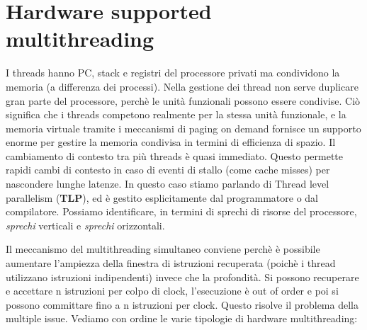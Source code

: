 \section{Hardware supported multithreading}
I threads hanno PC, stack e registri del processore privati ma condividono la memoria (a differenza dei processi). Nella gestione dei thread non serve duplicare gran parte del processore, perchè le unità funzionali possono essere condivise. Ciò significa che i threads competono realmente per la stessa unità funzionale, e la memoria virtuale tramite i meccanismi di paging on demand fornisce un supporto enorme per gestire la memoria condivisa in termini di efficienza di spazio. Il cambiamento di contesto tra più threads è quasi immediato. Questo permette rapidi cambi di contesto in caso di eventi di stallo (come cache misses) per nascondere lunghe latenze. In questo caso stiamo parlando di Thread level parallelism (\textbf{TLP}), ed è gestito esplicitamente dal programmatore o dal compilatore. 
Possiamo identificare, in termini di sprechi di risorse del processore, \textit{sprechi} verticali e \textit{sprechi} orizzontali.

\begin{figure}[ht]
    \centering
    \setlength{\fboxrule}{0.5pt} %
    \setlength{\fboxsep}{0pt}    %
\end{figure}

Il meccanismo del multithreading simultaneo conviene perchè è possibile aumentare l'ampiezza della finestra di istruzioni recuperata (poichè i thread utilizzano istruzioni indipendenti) invece che la profondità. Si possono recuperare e accettare n istruzioni per colpo di clock, l'esecuzione è out of order e poi si possono committare fino a n istruzioni per clock. Questo risolve il problema della multiple issue. Vediamo con ordine le varie tipologie di hardware multithreading:

